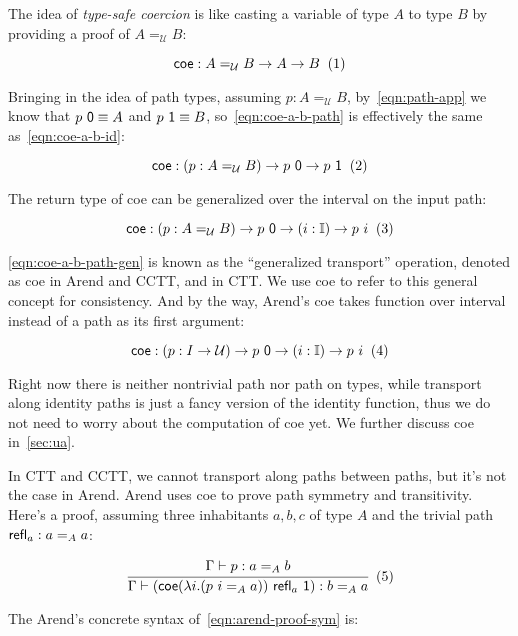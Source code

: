 The idea of \textit{type-safe coercion} is like
casting a variable of type $A$ to type $B$ by providing a proof
of $A =_{\mathcal U} B$:

\[
  \textsf{coe} : A =_{\mathcal U} B \rightarrow A \rightarrow B
  \xtag \label{eqn:coe-a-b-id}
\]

Bringing in the idea of path types,
assuming $p : A =_{\mathcal U} B$, by~\ref{eqn:path-app}
we know that $p \ \textsf 0 \equiv A$ and
$p \ \textsf 1 \equiv B$,
so~\ref{eqn:coe-a-b-path} is effectively the same
as~\ref{eqn:coe-a-b-id}:

\[
  \textsf{coe} : (p : A =_{\mathcal U} B) \rightarrow p \ \textsf 0
  \rightarrow p \ \textsf 1
  \xtag \label{eqn:coe-a-b-path}
\]

The return type of \textsf{coe} can be generalized over
the interval on the input path:

\[
  \textsf{coe} : (p : A =_{\mathcal U} B) \rightarrow p \ \textsf 0
  \rightarrow (i : \mathbb I) \rightarrow p \ i
  \xtag \label{eqn:coe-a-b-path-gen}
\]

\ref{eqn:coe-a-b-path-gen} is known as the ``generalized transport''
operation, denoted as \textsf{coe} in Arend and CCTT,
and  in CTT.
We use \textsf{coe} to refer to this general concept for consistency.
And by the way,
Arend's \textsf{coe} takes function over interval instead
of a path as its first argument:

\[
  \textsf{coe} : (p : I \rightarrow \mathcal U)
  \rightarrow p \ \textsf 0
  \rightarrow (i : \mathbb I) \rightarrow p \ i
  \xtag
\]

Right now there is neither nontrivial path nor path on types,
while transport along identity paths is just a fancy version
of the identity function, thus we do not need to worry about the
computation of \textsf{coe} yet.
We further discuss \textsf{coe} in~\cref{sec:ua}.

In CTT and CCTT, we cannot transport along paths between paths,
but it's not the case in Arend.
Arend uses \textsf{coe} to prove path symmetry and transitivity.
Here's a proof, assuming three inhabitants $a, b, c$ of type $A$
and the trivial path $\textsf{refl}_a : a =_A a$:

\[
  \cfrac{
    \Gamma \vdash p : a =_A b
  }{
    \Gamma \vdash (\textsf{coe}
    (\lambda i. (p\ i =_A a)) \ \refl_a \ \textsf 1)
    : b =_A a
  }
  \xtag \label{eqn:arend-proof-sym}
\]

The Arend's concrete syntax of~\ref{eqn:arend-proof-sym} is:

